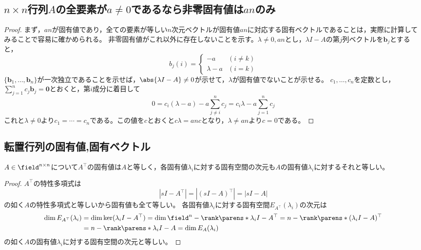         \subsection{\texorpdfstring{$n\times n$}{n×n}行列\texorpdfstring{$A$}{A}の全要素が\texorpdfstring{$a\neq 0$}{a≠0}であるなら非零固有値は\texorpdfstring{$an$}{an}のみ}
            \begin{proof}
                まず，$an$が固有値であり，全ての要素が等しい$n$次元ベクトルが固有値$an$に対応する固有ベクトルであることは，実際に計算してみることで容易に確かめられる。
                非零固有値がこれ以外に存在しないことを示す。$\lambda\neq 0,an$とし，$\lambda I-A$の第$j$列ベクトルを$\bm{b}_j$とすると，
                \[
                    b_j(i) =
                    \begin{cases}
                        -a & (i\neq k)\\
                        \lambda-a & (i=k)
                    \end{cases}
                \]
                $\{\bm{b}_1,\dotsc,\bm{b}_n\}$が一次独立であることを示せば，$\abs{\lambda I-A}\neq 0$が示せて，$\lambda$が固有値でないことが示せる。
                $c_1,\dotsc,c_n$を定数とし，$\sum_{j=1}^{n}{c_j\bm{b}_j}=\bm{0}$とおくと，第$i$成分に着目して
                \[0 = c_i(\lambda-a) - a\sum_{j\neq i}^{n}{c_j} = c_i\lambda - a\sum_{j=1}^{n}{c_j}\]
                これと$\lambda\neq 0$より$c_1=\dotsb=c_n$である。この値を$c$とおくと$c\lambda = anc$となり，$\lambda\neq an$より$c=0$である。
            \end{proof}
        \subsection{転置行列の固有値,固有ベクトル}
            \begin{shadebox}
                $A\in\field^{n\times n}$について$A^\top$の固有値は$A$と等しく，各固有値$\lambda_i$に対する固有空間の次元も$A$の固有値$\lambda_i$に対するそれと等しい。
            \end{shadebox}
            \begin{proof}
                $A^\top$の特性多項式は
                \[|sI-A^\top| = |(sI-A)^\top| = |sI-A|\]
                の如く$A$の特性多項式と等しいから固有値も全て等しい。
                各固有値$\lambda_i$に対する固有空間$E_{A^\top}(\lambda_i)$の次元は
                \begin{align*}
                    \dim E_{A^\top}(\lambda_i) &= \dim\ker(\lambda_i I-A^\top) = \dim \field^n-\rank\parens*{\lambda_i I-A^\top} = n-\rank\parens*{(\lambda_i I-A)^\top}\\
                    &=n-\rank\parens*{\lambda_i I-A} = \dim E_A(\lambda_i)
                \end{align*}
                の如く$A$の固有値$\lambda_i$に対する固有空間の次元と等しい。
            \end{proof}
